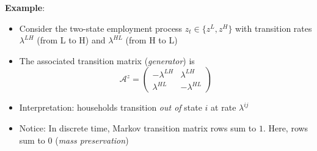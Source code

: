 \documentclass[10pt]{beamer}
\begin{document}
\begin{frame}{}

\textbf{Example}: 

\vspace{5mm}
{\small
\begin{itemize}
\item Consider the two-state employment process $z_t \in \{z^L, z^H\}$ with transition rates $\lambda^{LH}$ (from L to H) and $\lambda^{HL}$ (from H to L)

\item The associated transition matrix (\textit{generator}) is 
\begin{equation*}
	\mathcal A^z = \begin{pmatrix} - \lambda^{LH} & \lambda^{LH} \\ \lambda^{HL} & -\lambda^{HL} \end{pmatrix}
\end{equation*}

\item Interpretation: households transition \textit{out of} state $i$ at rate $\lambda^{ij}$

\item Notice: In discrete time, Markov transition matrix rows sum to $1$. Here, rows sum to $0$ (\textit{mass preservation})
\end{itemize}
}
\end{frame}
\end{document}

